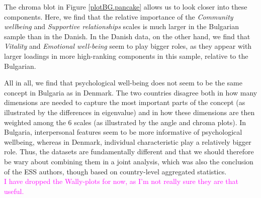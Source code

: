 \documentclass[titlepage,11pt,twoside]{article}
\newcommand{\hl}[1]{\textcolor{magenta}{#1}}
\begin{document}
 The chroma blot in Figure \ref{plotBG.pancake} allows us to look closer into these components. Here, we find that the relative importance of the \textit{Community wellbeing} and \textit{Supportive relationships} scales is much larger in the Bulgarian sample than in the Danish. In the Danish data, on the other hand, we find that \textit{Vitality} and \textit{Emotional well-being} seem to play bigger roles, as they appear with larger loadings in more high-ranking components in this sample, relative to the Bulgarian. 
 
All in all, we find that psychological well-being does not seem to be the same concept in Bulgaria as in Denmark. The two countries disagree both in how many dimensions are needed to capture the most important parts of the concept (as illustrated by the differences in eigenvalue) and in how these dimensions are then weighted among the 6 scales (as illustrated by the angle and chroma plots). In Bulgaria, interpersonal features seem to be more informative of psychological wellbeing, whereas in Denmark, individual characteristic play a relatively bigger role. Thus, the datasets are fundamentally different and that we should therefore be wary about combining them in a joint analysis, which was also the conclusion of the ESS authors, though based on country-level aggregated statistics. \\

\hl{I have dropped the Wally-plots for now, as I'm not really sure they are that useful.}



\end{document}
